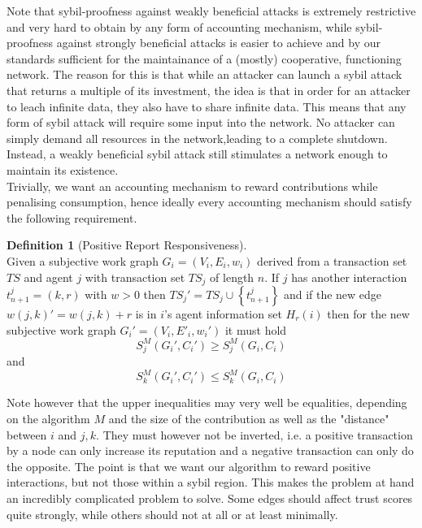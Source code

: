 \documentclass[11pt,a4paper]{report}
\theoremstyle{definition}
\newtheorem{definition}{Definition}[section]
\theoremstyle{theorem}
\theoremstyle{proposition}
\theoremstyle{corollary}
\theoremstyle{lemma}
\theoremstyle{example}
\theoremstyle{remark}
\begin{document}
\noindent{}Note that sybil-proofness against weakly beneficial attacks is extremely restrictive and very hard to obtain by any form of accounting mechanism, while sybil-proofness against strongly beneficial attacks is easier to achieve and by our standards sufficient for the maintainance of a (mostly) cooperative, functioning network. The reason for this is that while an attacker can launch a sybil attack that returns a multiple of its investment, the idea is that in order for an attacker to leach infinite data, they also have to share infinite data. This means that any form of sybil attack will require some input into the network. No attacker can simply demand all resources in the network,leading to a complete shutdown. Instead, a weakly beneficial sybil attack still stimulates a network enough to maintain its existence. \vspace{1em}\\

\noindent{}Trivially, we want an accounting mechanism to reward contributions while penalising consumption, hence ideally every accounting mechanism should satisfy the following requirement.

\begin{definition}[Positive Report Responsiveness]\ \\
Given a subjective work graph $G_i=(V_i,E_i,w_i)$ derived from a transaction set $TS$ and agent $j$ with transaction set $TS_j$ of length $n$. If $j$ has another interaction $t^j_{n+1}=(k,r)$ with $w>0$ then $TS_j'=TS_j\cup\left\lbrace{}t^j_{n+1}\right\rbrace$ and if the new edge $w(j,k)'=w(j,k)+r$ is in $i$'s agent information set $H_r(i)$ then for the new subjective work graph $G_i'=(V_i,E'_i,w_i')$ it must hold
\[
S^M_j(G_i',C_i')\geq{}S^M_j(G_i,C_i)
\]
and
\[
S^M_k(G_i',C_i')\leq{}S^M_k(G_i,C_i)
\]
\end{definition}

\noindent{}Note however that the upper inequalities may very well be equalities, depending on the algorithm $M$ and the size of the contribution as well as the "distance" between $i$ and $j,k$. They must however not be inverted, i.e. a positive transaction by a node can only increase its reputation and a negative transaction can only do the opposite. The point is that we want our algorithm to reward positive interactions, but not those within a sybil region. This makes the problem at hand an incredibly complicated problem to solve. Some edges should affect trust scores quite strongly, while others should not at all or at least minimally. \vspace{1em}\\
\end{document}
